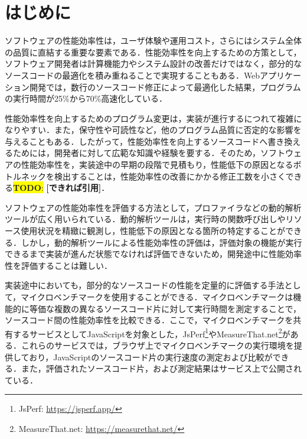 \documentclass[submit,techrep,noauthor]{ipsj}
\newcommand{\todo}[1]{\colorbox{yellow}{{\bf TODO}:}{\color{red} {\textbf{[#1]}}}}
\begin{document}
\maketitle

\section{はじめに}

 ソフトウェアの性能効率性は，ユーザ体験や運用コスト，さらにはシステム全体の品質に直結する重要な要素である\cite{performance1}\cite{performance2}\cite{negative}．性能効率性を向上するための方策として，ソフトウェア開発者は計算機能力やシステム設計の改善だけではなく，部分的なソースコードの最適化を積み重ねることで実現することもある．Webアプリケーション開発では，数行のソースコード修正によって最適化した結果，プログラムの実行時間が25\%から70\%高速化している\cite{jsRefac}．

性能効率性を向上するためのプログラム変更は，実装が進行するにつれて複雑になりやすい\cite{complicate}．また，保守性や可読性など，他のプログラム品質に否定的な影響を与えることもある\cite{negative}．したがって，性能効率性を向上するソースコードへ書き換えるためには，開発者に対して広範な知識や経験を要する．そのため，ソフトウェアの性能効率性を，実装途中の早期の段階で見積もり，性能低下の原因となるボトルネックを検出することは，性能効率性の改善にかかる修正工数を小さくできる\todo{できれば引用}． 

ソフトウェアの性能効率性を評価する方法として，プロファイラなどの動的解析ツールが広く用いられている．動的解析ツールは，実行時の関数呼び出しやリソース使用状況を精緻に観測し，性能低下の原因となる箇所の特定することができる．しかし，動的解析ツールによる性能効率性の評価は，評価対象の機能が実行できるまで実装が進んだ状態でなければ評価できないため，開発途中に性能効率性を評価することは難しい．

実装途中においても，部分的なソースコードの性能を定量的に評価する手法として，マイクロベンチマークを使用することができる．マイクロベンチマークは機能的に等価な複数の異なるソースコード片に対して実行時間を測定することで，ソースコード間の性能効率性を比較できる．ここで，マイクロベンチマークを共有するサービスとしてJavaScriptを対象とした，JsPerf\footnote{JsPerf: \url{https://jsperf.app/}}やMeasureThat.net\footnote{MeasureThat.net: \url{https://measurethat.net/}}がある．これらのサービスでは，ブラウザ上でマイクロベンチマークの実行環境を提供しており，JavaScriptのソースコード片の実行速度の測定および比較ができる．また，評価されたソースコード片，および測定結果はサービス上で公開されている．
\end{document}

